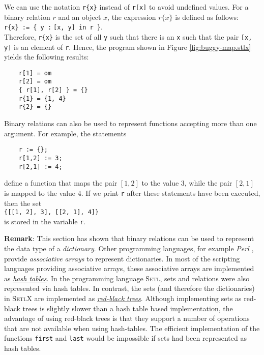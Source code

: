 We can use the notation  \texttt{r\{x\}} instead of \texttt{r[x]} to avoid undefined values.
For a binary relation $r$ and an object $x$, the expression $r\{x\}$ is defined as
follows: 
\\[0.2cm]
\hspace*{1.3cm} 
\texttt{r\{x\} := \{ y :$\;$[x, y] in r \}}.
\\[0.2cm]
Therefore, \texttt{r\{x\}} is the set of all \texttt{y} such that there is an \texttt{x} such that
the pair \texttt{[x, y]} is an element of \texttt{r}.
Hence, the  program shown in Figure \ref{fig:buggy-map.stlx} yields the following results:
\begin{verbatim}
    r[1] = om
    r[2] = om
    { r[1], r[2] } = {}
    r{1} = {1, 4}
    r{2} = {}
\end{verbatim}
Binary relations can also be used to represent functions accepting more than one argument.  For example, the
statements
\begin{verbatim}
    r := {};
    r[1,2] := 3;
    r[2,1] := 4;
\end{verbatim}
define a function that maps the pair $[1,2]$ to the value $3$, while the pair $[2,1]$ is mapped to
the value $4$.  If we print \texttt{r} after these statements have been executed, then the set
\\[0.2cm]
\hspace*{1.3cm}
\texttt{\{[[1, 2], 3], [[2, 1], 4]\}}
\\[0.2cm]
is stored in the variable \texttt{r}.
\vspace*{0.2cm}

\noindent
\textbf{Remark}:
This section has shown that binary relations can be used to represent the data type of a
\emph{dictionary}.  Other programming languages, for example \textsl{Perl} \cite{Wall92},
provide \emph{associative arrays} to represent dictionaries.  In most of the scripting languages
providing associative arrays, these associative arrays are implemented as 
\href{http://en.wikipedia.org/wiki/Hash_table}{\emph{hash tables}}.  In the programming language
\textsc{Setl}, sets and relations were also represented via hash tables.
In contrast, the sets (and therefore the dictionaries) in \textsc{SetlX} are implemented as 
\href{http://en.wikipedia.org/wiki/Red-black_tree}{\emph{red-black trees}}.
Although implementing sets as red-black trees is slightly slower than a hash table based
implementation, the advantage of using red-black trees is that they support a number of operations
that are not available when using hash-tables.  The efficient implementation of the functions \texttt{first}
and \texttt{last} would be impossible if sets had been represented as hash tables.


